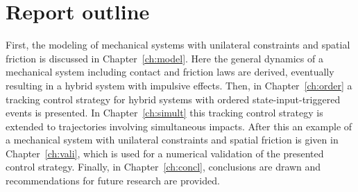 \documentclass[../DC2017114Bouma.tex]{subfiles}
\begin{document}
\section{Report outline}
First, the modeling of mechanical systems with unilateral constraints and spatial friction is discussed in Chapter~\ref{ch:model}. Here the general dynamics of a mechanical system including contact and friction laws are derived, eventually resulting in a hybrid system with impulsive effects. Then, in Chapter~\ref{ch:order} a tracking control strategy for hybrid systems with ordered state-input-triggered events is presented. In Chapter~\ref{ch:simult} this tracking control strategy is extended to trajectories involving simultaneous impacts. After this an example of a mechanical system with unilateral constraints and spatial friction is given in Chapter~\ref{ch:vali}, which is used for a numerical validation of the presented control strategy. Finally, in Chapter~\ref{ch:concl}, conclusions are drawn and recommendations for future research are provided.
\end{document}
